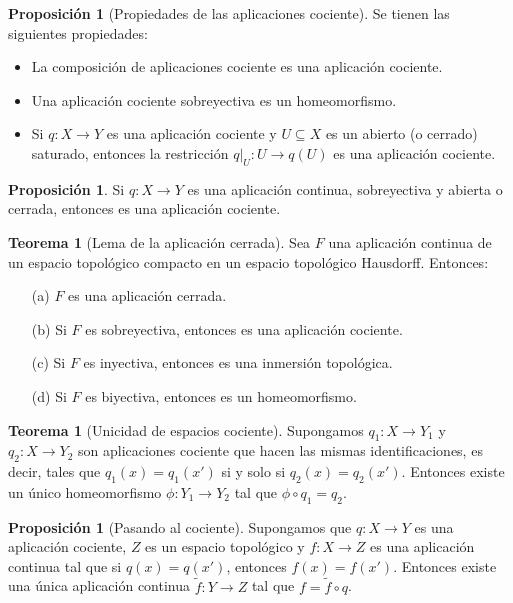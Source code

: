 \documentclass[10pt]{report}
\theoremstyle{definition}
\newtheorem{tma}[defin]{Teorema}
\newtheorem{prop}[defin]{Proposición}
\begin{document}
\begin{prop}[Propiedades de las aplicaciones cociente]
Se tienen las siguientes propiedades:
\begin{itemize}
\item La composición de aplicaciones cociente es una aplicación cociente.
\item Una aplicación cociente sobreyectiva es un homeomorfismo.
\item Si $q:X\to Y$ es una aplicación cociente y $U\subseteq X$ es un abierto (o cerrado) saturado, entonces la restricción $q|_U:U\to q(U)$ es una aplicación cociente.
\end{itemize}
\end{prop}
\begin{prop}
Si $q:X\to Y$ es una aplicación continua, sobreyectiva y abierta o cerrada, entonces es una aplicación cociente.
\end{prop}

\begin{tma}[Lema de la aplicación cerrada]\label{teo:aplicac_cerrada}
Sea $F$ una aplicación continua de un espacio topológico compacto en un espacio topológico Hausdorff. Entonces:
\begin{itemize}
\item[(a)]$F$ es una aplicación cerrada.
\item[(b)] Si $F$ es sobreyectiva, entonces es una aplicación cociente.
\item[(c)] Si $F$ es inyectiva, entonces es una inmersión topológica. %
\item[(d)] Si $F$ es biyectiva, entonces es un homeomorfismo.
\end{itemize}
\end{tma}

\begin{tma}[Unicidad de espacios cociente]
\label{teo:unicidad_espacio_cociente}
Supongamos $q_1:X\to Y_1$ y $q_2:X\to Y_2$ son aplicaciones cociente que hacen las mismas identificaciones, es decir, tales que $q_1(x)=q_1(x')$ si y solo si $q_2(x)=q_2(x')$. Entonces existe un único homeomorfismo $\phi:Y_1\to Y_2$ tal que $\phi \circ q_1=q_2$.
\end{tma}

\begin{prop}[Pasando al cociente]
Supongamos que $q:X\to Y$ es una aplicación cociente, $Z$ es un espacio topológico y $f:X\to Z$ es una aplicación continua tal que si $q(x)=q(x')$, entonces $f(x)=f(x')$. Entonces existe una única aplicación continua $\tilde{f}:Y\to Z$ tal que $f=\tilde{f} \circ q$.
\end{prop}
\end{document}
